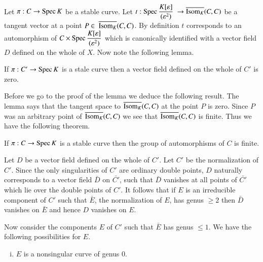 {Let $\pi : C \rightarrow \operatorname{Spec} K $ be a stable curve.\label{page12} Let $t: \operatorname{Spec}
\dfrac{K [\varepsilon]}{(\varepsilon^2)} ~ \rightarrow
\overline{\operatorname{Isom}_K} (C,C) $ be a  tangent vector at a point  $ P
\in \; \overline{\operatorname{Isom}_K} (C,C)$. By definition $t$ corresponds to
an automorphism of $ C \times   \operatorname{Spec} \dfrac{K
  [\varepsilon]}{(\varepsilon^2)} $  which is canonically identified
with a vector field  $D$ defined on the whole of $X$. Now note the
following lemma. 

\setcounter{sublemma}{6}
\begin{sublemma}\label{chap0:sublem0.1.7} %
If \pageoriginale $\pi : C' \rightarrow \operatorname{Spec} K$ is  a stale curve
then a vector field defined on the whole  of $C'$ is zero.  
\end{sublemma}\label{page14}

Before we go to the  proof of the lemma we deduce the following
result. The lemma says that the tangent space to $\overline{\operatorname{Isom}_K}
(C,C)$ at the point $P$ is zero. Since $P$ was an arbitrary  point
of $  \overline{\operatorname{Isom}_K} (C,C)$ we see that $ \overline{\operatorname{Isom}_K} (C,C)$
is finite. Thus we have the following theorem. 

\setcounter{subtheorem}{7}
\begin{subtheorem}\label{chap0:subthm0.1.8} %
If  $ \pi : C \rightarrow \operatorname{Spec} K $  is a  stable curve then the group 
of  automorphisms of $C$ is finite. 
\end{subtheorem}


\setcounter{proofofthelemma}{6}
\begin{proofofthelemma} %
Let $D$ be a  vector field defined on the whole of $C'$. Let $C'$ be
the normalization of $C'$. Since the only singularities of $C'$ are
ordinary double points, $D$ naturally corresponds to a vector field
$\bar{D}$ on $\bar{C'}$, such that $\bar{D}$  vanishes  at all points
of $\bar{C'}$ which lie over the double points of $C'$. It follows
that if $E$ is an irreducible component of $C'$ such that $\bar{E}$,
the normalization of $E$, has genus $\ge 2$ then $\bar{D}$ vanishes on
$\bar{E}$ and hence  $D$ vanishes on $E$. 
\end{proofofthelemma}

Now consider the components  $E$ of $C'$ such that $\bar{E}$ has genus
$\leq 1$. We have the following possibilities for $E$. 
\begin{enumerate}[i)]
\item  $E$ is a  nonsingular curve of  genus $0$.


\end{enumerate}}
